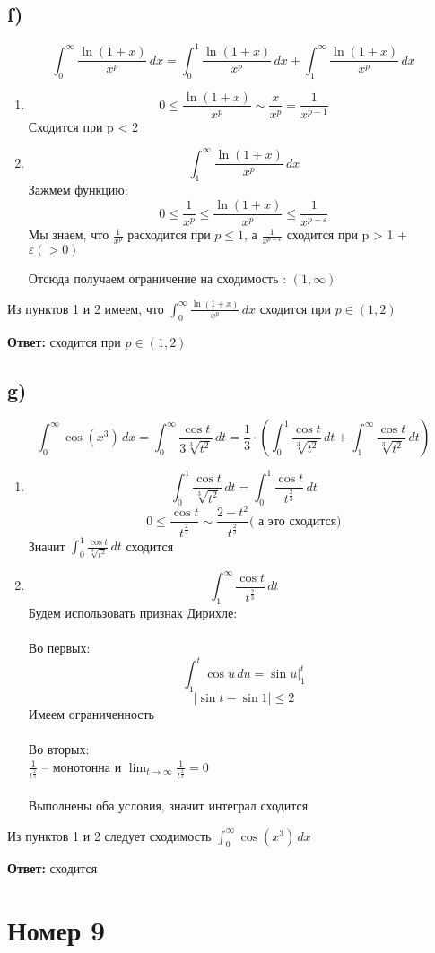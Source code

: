 \documentclass[a4paper,12pt]{article}
\begin{document}
\subsection*{f)}
\[
\int_0^{\infty} \frac{\ln (1+x)}{x^p} \, dx = \int_0^{1} \frac{\ln (1+x)}{x^p} \, dx + \int_1^{\infty} \frac{\ln (1+x)}{x^p} \, dx
\]
\begin{enumerate}
\item
\[
0 \leq  \frac{\ln (1+x)}{x^p} \sim \frac{x}{x^p} = \frac{1}{x^{p-1}}
\]
Сходится при p < 2
\item
\[
\int_1^{\infty} \frac{\ln (1+x)}{x^p} \, dx
\]
Зажмем функцию:
\[
0 \leq \frac{1}{x^p} \leq \frac{\ln (1+x)}{x^p} \leq \frac{1}{x^{p - \varepsilon}}
\]
Мы знаем, что $\frac{1}{x^p}$ расходится при $p \leq 1$, а $\frac{1}{x^{p - \varepsilon}}$ сходится при p > 1 + $\varepsilon (> 0)$ 

Отсюда получаем ограничение на сходимость : $(1, \infty)$
\end{enumerate}
Из пунктов 1 и 2 имеем, что $\int_0^{\infty} \frac{\ln (1+x)}{x^p} \, dx$  сходится при $p \in (1, 2)$
{\Large \begin{center}
\textbf{Ответ: } сходится при $p \in (1, 2)$
\end{center}}
\clearpage
\subsection*{g)}
\[
\int_0^{\infty} \cos \left(x^3\right) \, dx = \int_0^{\infty} \frac{\cos t}{3 \sqrt[3]{t^2}} \, dt = \frac{1}{3} \cdot \left( \int_0^{1} \frac{\cos t}{\sqrt[3]{t^2}} \, dt  + \int_1^{\infty} \frac{\cos t}{ \sqrt[3]{t^2}} \, dt  \right)
\]
\begin{enumerate}
\item 
\[
\int_0^{1} \frac{\cos t}{\sqrt[3]{t^2}} \, dt = \int_0^{1} \frac{\cos t}{ t^{\frac{2}{3}}} \, dt
\]
\[
0 \leq \frac{\cos t}{ t^{\frac{2}{3}}} \sim \frac{2-t^2}{t^{\frac{2}{3}}} \text{( а это сходится)}
\]
Значит $\int_0^{1} \frac{\cos t}{\sqrt[3]{t^2}} \, dt$ сходится
\item
\[
\int_1^{\infty} \frac{\cos t}{ t^{\frac{2}{3}}} \, dt
\]
Будем использовать признак Дирихле:
\\\\
Во первых:
\[
\int_{1}^{t} \cos u \, du = \sin u \bigg|_1^t
\]
\[
|\sin t  - \sin 1| \leq 2 
\]
Имеем ограниченность
\\\\
Во вторых:
\\
$\frac{1}{t^{\frac{2}{3}}} $ -- монотонна и $\lim_{t \rightarrow \infty} \frac{1}{t^{\frac{2}{3}}} = 0 $
\\\\
Выполнены оба условия, значит интеграл сходится
\end{enumerate}
Из пунктов 1 и 2 следует сходимость $\int_0^{\infty} \cos \left(x^3\right) \, dx$
{\Large \begin{center}
\textbf{Ответ: } сходится
\end{center}
\clearpage
\section*{ Номер 9}}
\end{document}
